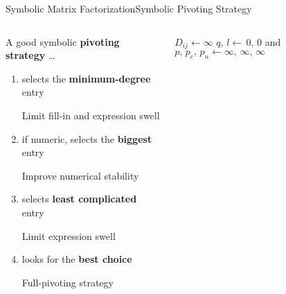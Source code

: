 \begin{frame}{Symbolic Matrix Factorization}{Symbolic Pivoting Strategy}
  \vspace{-1.5em}
  \begin{columns}
    \begin{column}[c]{0.47\textwidth}
      A good symbolic \textbf{pivoting strategy} \dots
      \begin{enumerate}
        \item<1> selects the \textbf{minimum-degree} entry \\
        \begin{small}
          \qquad Limit fill-in and expression swell
        \end{small}
        \item<2> if numeric, selects the \textbf{biggest} entry \\
        \begin{small}
          \qquad Improve numerical stability
        \end{small}
        \item<3> selects \textbf{least complicated} entry \\
        \begin{small}
          \qquad Limit expression swell
        \end{small}
        \item<4> looks for the \textbf{best choice} \\
        \begin{small}
          \qquad Full-pivoting strategy
        \end{small}
      \end{enumerate}
    \end{column}
    \begin{column}[c]{0.53\textwidth}
      \begin{algorithmic}\scriptsize
        \State {}
              \State $D_{ij} \gets \infty$
              {}
            \EndFor
          \EndFor
          \State {}
          \State $q, \, l \gets \, 0, \, 0$  and $p, \, p_c, \, p_n \gets \infty, \, \infty, \, \infty$

\end{algorithmic}
\end{column}
\end{columns}
\end{frame}
